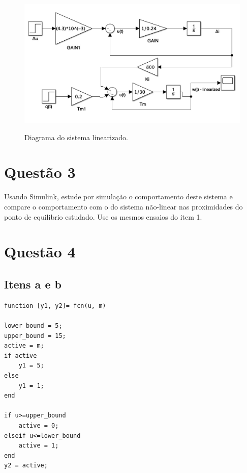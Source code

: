 \documentclass[11pt]{article}
\begin{document}
\begin{figure}[H]
	\centering
	{\includegraphics[width=\textwidth]
		{assets/q2_linearized_schema.jpg}}
	\caption{Diagrama do sistema linearizado.}
\end{figure}

\section{Questão 3}
Usando Simulink, estude por simulação o comportamento deste sistema e compare o comportamento
com o do sistema não-linear nas proximidades do ponto de equilibrio estudado. Use os mesmos ensaios
do item 1.

\section{Questão 4}
\subsection{Itens a e b}
\begin{lstlisting}[caption={Código usado para controlar a planta},captionpos=b]
function [y1, y2]= fcn(u, m)

lower_bound = 5;
upper_bound = 15;
active = m;
if active
    y1 = 5;
else
    y1 = 1;
end

if u>=upper_bound
    active = 0;
elseif u<=lower_bound
    active = 1;
end
y2 = active;
\end{lstlisting}
\end{document}
